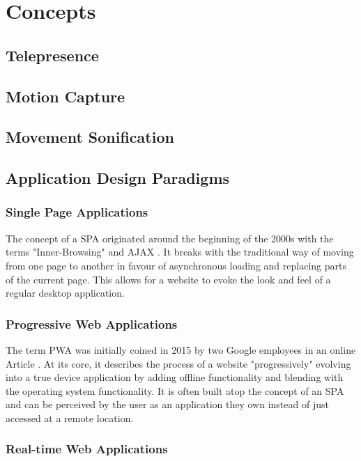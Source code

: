 \chapter{Concepts}

\section{Telepresence}

\section{Motion Capture}

\section{Movement Sonification}

\section{Application Design Paradigms}

\subsection{Single Page Applications}

The concept of a \ac{SPA} originated around the beginning of the 2000s with the terms "Inner-Browsing" \parencite{innerBrowsing} and \ac{AJAX} \parencite{ajaxNewApproach}. It breaks with the traditional way of moving from one page to another in favour of asynchronous loading and replacing parts of the current page. This allows for a website to evoke the look and feel of a regular desktop application.

\subsection{Progressive Web Applications}

The term \ac{PWA} was initially coined in 2015 by two Google employees in an online Article \parencite{progressiveWebApplications}. At its core, it describes the process of a website "progressively" evolving into a true device application by adding offline functionality and blending with the operating system functionality. It is often built atop the concept of an \ac{SPA} and can be perceived by the user as an application they own instead of just accessed at a remote location.

\subsection{Real-time Web Applications}


